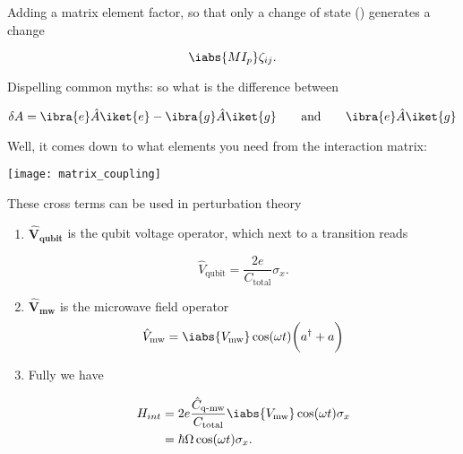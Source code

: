 \begin{minipage}{0.5\linewidth}
\begin{enumerate}
  \noindent  {}

  Adding a  matrix element  factor, so  that only a  change of  state (\ilra{})
  generates a change

    \begin{equation}\label{eq:couple13}
      \iabs{MI_p}\zeta_{ij}.
    \end{equation}

  \end{enumerate}
\end{minipage}

\newpage

\begin{framed}
  \noindent Dispelling common myths: so what is the difference between

  \begin{equation}
    \label{eq:myth1}
    \delta A = \ibra{e}\hat{A}\iket{e} - \ibra{g}\hat{A}\iket{g} \qquad \text{and} \qquad \ibra{e}\hat{A}\iket{g}
  \end{equation}

  \noindent Well, it comes down to what elements you need from the interaction matrix:

  \begin{center}
    \texttt{[image: matrix\_coupling]}

    {\small These cross terms can be used in perturbation theory\label{fig:matrix_coupling}}
  \end{center}

\end{framed}
\begin{enumerate}

\item  $ \mathbf{\hat{V}_\text{qubit}}  $ is  the  qubit voltage  operator, which  next to  a
  transition reads

  \begin{equation}\label{eq:couple5}
    \hat{V}_\text{qubit} = \frac{2e}{C_\text{total}}\sigma_x.
  \end{equation}

\item $ \mathbf{\hat{V}_\text{mw}} $ is the microwave field operator
  \begin{equation}\label{eq:couple6}
    {\hat{V}_\text{mw} = \iabs{V_{\text{mw}}}\cos(\omega t)\bigg(a^\dagger +a\bigg)}
  \end{equation}
\item Fully we have

  \begin{equation}
    \begin{aligned}
      H_{int}&=2e\frac{\hat{C}_\text{q-mw}}{C_\text{total}}\iabs{V_{\text{mw}}}\cos(\omega t)\sigma_x\\
      &= \hbar\Omega\cos(\omega t)\sigma_x.
    \end{aligned}
  \end{equation}
\end{enumerate}

